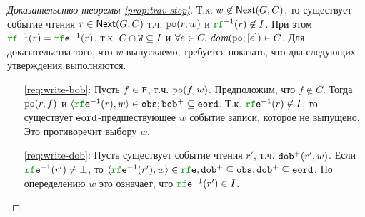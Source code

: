 \begin{proof}[Доказательство теоремы \ref{prop:trav-step}]
  Т.к. $w \not\in {\sf Next}(G, C)$, то существует событие чтения $r \in {\sf Next}(G, C)$ т.ч. $\lPO(r, w)$
  и $\lRF^{-1}(r) \nin \IssuedSet$. При этом $\lRF^{-1}(r) = \lRFE^{-1}(r)$, т.к.
  $C \cap {\mathtt{W}} \subseteq I$ и $\forall e \in C. \; \dom{\lPO; [e]} \in C$.
  Для доказательства того, что $w$ выпускаемо, требуется  показать, что два следующих утверждения выполняются.
  \begin{itemize}
    \item[\ref{req:write-bob}:] Пусть $f \in {\mathtt{F}}$, т.ч. $\lPO(f, w)$.
      Предположим, что $f \nin C$. Тогда $\lPO(r, f)$ и $\tup{\lRFE^{-1}{(r)}, w} \in \lOBS; \lBOB^{+} \suq \lEORD$.
      Т.к. $\lRFE^{-1}(r) \nin \IssuedSet$, то существует ${\mathtt{eord}}$-предшествующее $w$ событие записи, которое не выпущено.
      Это противоречит выбору $w$.
    \item[\ref{req:write-dob}:] Пусть существует событие чтения $r'$, т.ч. ${\mathtt{dob}}^{+}(r', w)$.
      Если $\lRFE^{-1}(r') \neq \bot$, то
      $\tup{\lRFE^{-1}(r'), w} \in \lRFE; \lDOB^{+} \suq \lOBS; \lDOB^{+} \suq \lEORD$. По опеределению $w$ это означает,
      что $\lRFE^{-1}(r') \in \IssuedSet$.
\qedhere
\end{itemize}  
\end{proof}


